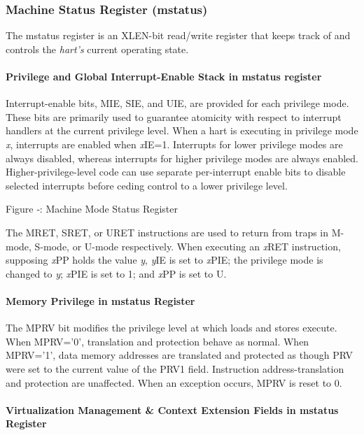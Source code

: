 \subsubsection{Machine Status Register
(mstatus)}\label{machine-status-register-mstatus}

The mstatus register is an XLEN-bit read/write register that keeps track
of and controls the \emph{hart's} current operating state.

\paragraph{Privilege and Global Interrupt-Enable Stack in mstatus register}

Interrupt-enable bits, MIE, SIE, and UIE, are provided for each
privilege mode. These bits are primarily used to guarantee atomicity
with respect to interrupt handlers at the current privilege level. When
a hart is executing in privilege mode \emph{x}, interrupts are enabled
when \emph{x}IE=1. Interrupts for lower privilege modes are always
disabled, whereas interrupts for higher privilege modes are always
enabled. Higher-privilege-level code can use separate per-interrupt
enable bits to disable selected interrupts before ceding control to a
lower privilege level.

\missingfigure{}

Figure ‑: Machine Mode Status Register

The MRET, SRET, or URET instructions are used to return from traps in
M-mode, S-mode, or U-mode respectively. When executing an \emph{x}RET
instruction, supposing \emph{x}PP holds the value \emph{y}, \emph{y}IE
is set to \emph{x}PIE; the privilege mode is changed to \emph{y};
\emph{x}PIE is set to 1; and \emph{x}PP is set to U.

\paragraph{Memory Privilege in mstatus Register
}\label{memory-privilege-in-mstatus-register}

The MPRV bit modifies the privilege level at which loads and stores
execute. When MPRV='0', translation and protection behave as normal.
When MPRV='1', data memory addresses are translated and protected as
though PRV were set to the current value of the PRV1 field. Instruction
address-translation and protection are unaffected. When an exception
occurs, MPRV is reset to 0.

\paragraph{Virtualization Management \& Context Extension Fields in
mstatus Register
}\label{virtualization-management-context-extension-fields-in-mstatus-register}

